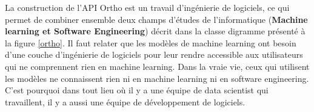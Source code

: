 \documentclass[12pt, french]{report}
\begin{document}
%
%

La construction de l'API Ortho est un travail d'ingénierie de logiciels, ce qui permet de combiner ensemble deux champs d'études de l'informatique (\textbf{Machine learning et Software Engineering}) décrit dans la classe digramme présenté à la figure \ref{ortho}. Il faut relater que les modèles de machine learning ont besoin d'une couche d'ingénierie de logiciels pour leur rendre accessible aux utilisateurs qui ne comprennent rien en machine learning. Dans la vraie vie, ceux qui utilisent les modèles ne connaissent rien ni en machine learning ni en software engineering. C'est pourquoi dans tout lieu où il y a une équipe de data scientist qui travaillent, il y a aussi une équipe de développement de logiciels.
\end{document}
